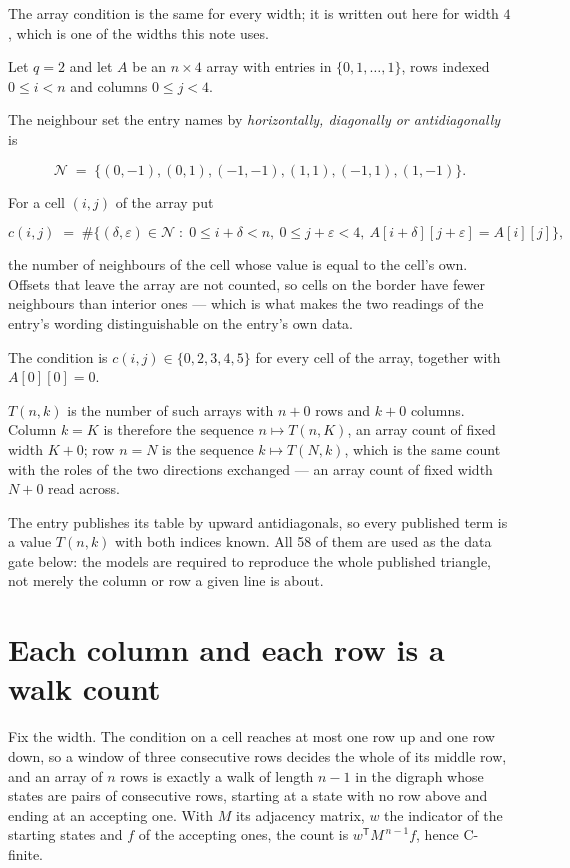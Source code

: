 \documentclass[11pt]{article}
\theoremstyle{definition}
\begin{document}
The array condition is the same for every width; it is written out here for width $4$, which is one of the widths this note uses.

Let $q = 2$ and let $A$ be an $n \times 4$ array with entries in $\{0,1,\dots,1\}$, rows indexed $0 \le i < n$ and columns $0 \le j < 4$.

The neighbour set the entry names by {\itshape horizontally, diagonally or antidiagonally} is

\[\mathcal{N} \;=\; \{(0,-1), (0,1), (-1,-1), (1,1), (-1,1), (1,-1)\}.\]

For a cell $(i,j)$ of the array put

\[c(i,j) \;=\; \#\bigl\{(\delta,\varepsilon)\in\mathcal{N} \;:\; 0\le i+\delta<n,\ 0\le j+\varepsilon<4,\ A[i+\delta][j+\varepsilon] = A[i][j]\bigr\},\]

the number of neighbours of the cell whose value is equal to the cell's own. Offsets that leave the array are not counted, so cells on the border have fewer neighbours than interior ones --- which is what makes the two readings of the entry's wording distinguishable on the entry's own data.

The condition is $c(i,j) \in \{0, 2, 3, 4, 5\}$ for every cell of the array, together with $A[0][0]=0$.

$T(n,k)$ is the number of such arrays with $n + 0$ rows and $k + 0$ columns. Column $k = K$ is therefore the sequence $n \mapsto T(n,K)$, an array count of fixed width $K + 0$; row $n = N$ is the sequence $k \mapsto T(N,k)$, which is the same count with the roles of the two directions exchanged --- an array count of fixed width $N + 0$ read across.

The entry publishes its table by upward antidiagonals, so every published term is a value $T(n,k)$ with both indices known. All 58 of them are used as the data gate below: the models are required to reproduce the whole published triangle, not merely the column or row a given line is about.

\section{Each column and each row is a walk count}

Fix the width. The condition on a cell reaches at most one row up and one row down, so a window of three consecutive rows decides the whole of its middle row, and an array of $n$ rows is exactly a walk of length $n-1$ in the digraph whose states are pairs of consecutive rows, starting at a state with no row above and ending at an accepting one. With $M$ its adjacency matrix, $w$ the indicator of the starting states and $f$ of the accepting ones, the count is $w^{\mathsf T}M^{\,n-1}f$, hence C-finite.
\end{document}
